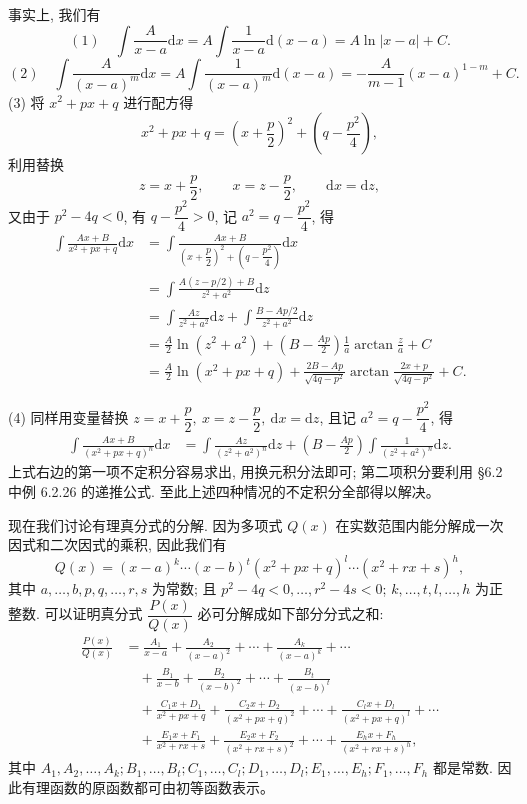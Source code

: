 \documentclass[UTF8,12pt,a4paper,fontset=fandol]{ctexart}
\begin{document}
事实上, 我们有
\[
  (1)\quad
  \int\frac A{x-a}\mathrm dx
  =
  A\int\frac1{x-a}\mathrm d(x-a)
  =
  A\ln|x-a|+C.
\]
\[
  (2)\quad
  \int\frac A{(x-a)^m}\mathrm dx
  =
  A\int\frac1{(x-a)^m}\mathrm d(x-a)
  =
  -\frac A{m-1}(x-a)^{1-m}+C.
\]
(3) 将 $x^2+px+q$ 进行配方得
\[
  x^2+px+q=\left(x+\frac p2\right)^2+\left(q-\frac{p^2}4\right),
\]
利用替换
\[
  z=x+\frac p2,\qquad x=z-\frac p2,\qquad \mathrm dx=\mathrm dz,
\]
又由于 $p^2-4q<0$, 有 $q-\dfrac{p^2}4>0$, 记 $a^2=q-\dfrac{p^2}4$, 得
\[
\begin{aligned}
  \int\frac{Ax+B}{x^2+px+q}\mathrm dx
  &=
  \int\frac{Ax+B}{\left(x+\dfrac p2\right)^2+\left(q-\dfrac{p^2}4\right)}\mathrm dx\\
  &=
  \int\frac{A(z-p/2)+B}{z^2+a^2}\mathrm dz\\
  &=
  \int\frac{Az}{z^2+a^2}\mathrm dz+
  \int\frac{B-Ap/2}{z^2+a^2}\mathrm dz\\
  &=
  \frac A2\ln(z^2+a^2)+\left(B-\frac{Ap}2\right)\frac1a\arctan\frac za+C\\
  &=
  \frac A2\ln(x^2+px+q)+
  \frac{2B-Ap}{\sqrt{4q-p^2}}\arctan\frac{2x+p}{\sqrt{4q-p^2}}+C.
\end{aligned}
\]

(4) 同样用变量替换 $z=x+\dfrac p2,\ x=z-\dfrac p2,\ \mathrm dx=\mathrm dz$, 且记 $a^2=q-\dfrac{p^2}4$, 得
\[
\begin{aligned}
  \int\frac{Ax+B}{(x^2+px+q)^n}\mathrm dx
  &=
  \int\frac{Az}{(z^2+a^2)^n}\mathrm dz+
  \left(B-\frac{Ap}2\right)\int\frac1{(z^2+a^2)^n}\mathrm dz.
\end{aligned}
\]
上式右边的第一项不定积分容易求出, 用换元积分法即可; 第二项积分要利用 \S 6.2 中例 6.2.26 的递推公式. 至此上述四种情况的不定积分全部得以解决。

现在我们讨论有理真分式的分解. 因为多项式 $Q(x)$ 在实数范围内能分解成一次因式和二次因式的乘积, 因此我们有
\[
  Q(x)=(x-a)^k\cdots(x-b)^t(x^2+px+q)^l\cdots(x^2+rx+s)^h,
\]
其中 $a,\ldots,b,p,q,\ldots,r,s$ 为常数; 且 $p^2-4q<0,\ldots,r^2-4s<0$; $k,\ldots,t,l,\ldots,h$ 为正整数. 可以证明真分式 $\dfrac{P(x)}{Q(x)}$ 必可分解成如下部分分式之和:
\[
\begin{aligned}
  \frac{P(x)}{Q(x)}
  &=
  \frac{A_1}{x-a}+\frac{A_2}{(x-a)^2}+\cdots+\frac{A_k}{(x-a)^k}+\cdots\\
  &\quad+
  \frac{B_1}{x-b}+\frac{B_2}{(x-b)^2}+\cdots+\frac{B_t}{(x-b)^t}\\
  &\quad+
  \frac{C_1x+D_1}{x^2+px+q}+\frac{C_2x+D_2}{(x^2+px+q)^2}
  +\cdots+\frac{C_lx+D_l}{(x^2+px+q)^l}+\cdots\\
  &\quad+
  \frac{E_1x+F_1}{x^2+rx+s}+\frac{E_2x+F_2}{(x^2+rx+s)^2}
  +\cdots+\frac{E_hx+F_h}{(x^2+rx+s)^h},
\end{aligned}
\]
其中 $A_1,A_2,\ldots,A_k; B_1,\ldots,B_t; C_1,\ldots,C_l; D_1,\ldots,D_l; E_1,\ldots,E_h; F_1,\ldots,F_h$ 都是常数. 因此有理函数的原函数都可由初等函数表示。
\end{document}
